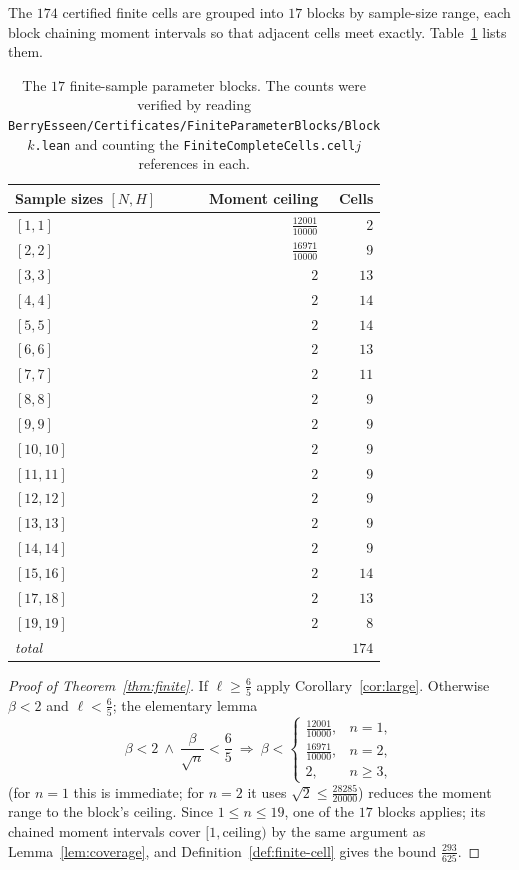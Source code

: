 \documentclass[10pt,a4paper]{article}
\theoremstyle{plain}
\theoremstyle{definition}
\newcommand{\lean}[1]{\texttt{#1}}
\newcommand{\file}[1]{\texttt{#1}}
\begin{document}
The $174$ certified finite cells are grouped into $17$ blocks by sample-size
range, each block chaining moment intervals so that adjacent cells meet exactly.
Table~\ref{tab:finite-blocks} lists them.

\begin{table}[ht]
\centering
\begin{tabular}{@{}lrr@{}}
\toprule
Sample sizes $[N,H]$ & Moment ceiling & Cells \\
\midrule
$[1,1]$   & $\tfrac{12001}{10000}$ & $2$ \\
$[2,2]$   & $\tfrac{16971}{10000}$ & $9$ \\
$[3,3]$   & $2$ & $13$ \\
$[4,4]$   & $2$ & $14$ \\
$[5,5]$   & $2$ & $14$ \\
$[6,6]$   & $2$ & $13$ \\
$[7,7]$   & $2$ & $11$ \\
$[8,8]$   & $2$ & $9$ \\
$[9,9]$   & $2$ & $9$ \\
$[10,10]$ & $2$ & $9$ \\
$[11,11]$ & $2$ & $9$ \\
$[12,12]$ & $2$ & $9$ \\
$[13,13]$ & $2$ & $9$ \\
$[14,14]$ & $2$ & $9$ \\
$[15,16]$ & $2$ & $14$ \\
$[17,18]$ & $2$ & $13$ \\
$[19,19]$ & $2$ & $8$ \\
\midrule
\emph{total} & & $174$ \\
\bottomrule
\end{tabular}
\caption{The $17$ finite-sample parameter blocks. The counts were verified by
reading \file{BerryEsseen/Certificates/FiniteParameterBlocks/Block$k$.lean} and
counting the \lean{FiniteCompleteCells.cell$j$} references in each.}
\label{tab:finite-blocks}
\end{table}

\begin{proof}[Proof of Theorem~\ref{thm:finite}]
If $\ell\ge\tfrac65$ apply Corollary~\ref{cor:large}. Otherwise $\beta<2$ and
$\ell<\tfrac65$; the elementary lemma
\[
  \beta<2 \ \wedge\ \frac{\beta}{\sqrt n}<\frac65
  \ \Longrightarrow\
  \beta < \begin{cases}
    \tfrac{12001}{10000}, & n=1,\\
    \tfrac{16971}{10000}, & n=2,\\
    2, & n\ge3,
  \end{cases}
\]
(for $n=1$ this is immediate; for $n=2$ it uses
$\sqrt2\le\tfrac{28285}{20000}$) reduces the moment range to the block's
ceiling. Since $1\le n\le19$, one of the $17$ blocks applies; its chained
moment intervals cover $[1,\text{ceiling})$ by the same argument as
Lemma~\ref{lem:coverage}, and Definition~\ref{def:finite-cell} gives the bound
$\tfrac{293}{625}$.
\end{proof}
\end{document}
